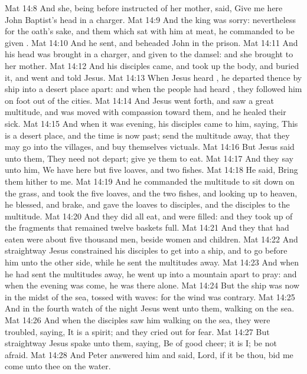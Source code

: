 \vs Mat 14:8 And she, being before instructed of her mother, said, Give me here John Baptist's head in a charger.
\vs Mat 14:9 And the king was sorry: nevertheless for the oath's sake, and them which sat with him at meat, he commanded  to be given .
\vs Mat 14:10 And he sent, and beheaded John in the prison.
\vs Mat 14:11 And his head was brought in a charger, and given to the damsel: and she brought  to her mother.
\vs Mat 14:12 And his disciples came, and took up the body, and buried it, and went and told Jesus.
\vs Mat 14:13 When Jesus heard , he departed thence by ship into a desert place apart: and when the people had heard , they followed him on foot out of the cities.
\vs Mat 14:14 And Jesus went forth, and saw a great multitude, and was moved with compassion toward them, and he healed their sick.
\vs Mat 14:15 And when it was evening, his disciples came to him, saying, This is a desert place, and the time is now past; send the multitude away, that they may go into the villages, and buy themselves victuals.
\vs Mat 14:16 But Jesus said unto them, They need not depart; give ye them to eat.
\vs Mat 14:17 And they say unto him, We have here but five loaves, and two fishes.
\vs Mat 14:18 He said, Bring them hither to me.
\vs Mat 14:19 And he commanded the multitude to sit down on the grass, and took the five loaves, and the two fishes, and looking up to heaven, he blessed, and brake, and gave the loaves to  disciples, and the disciples to the multitude.
\vs Mat 14:20 And they did all eat, and were filled: and they took up of the fragments that remained twelve baskets full.
\vs Mat 14:21 And they that had eaten were about five thousand men, beside women and children.
\vs Mat 14:22 And straightway Jesus constrained his disciples to get into a ship, and to go before him unto the other side, while he sent the multitudes away.
\vs Mat 14:23 And when he had sent the multitudes away, he went up into a mountain apart to pray: and when the evening was come, he was there alone.
\vs Mat 14:24 But the ship was now in the midst of the sea, tossed with waves: for the wind was contrary.
\vs Mat 14:25 And in the fourth watch of the night Jesus went unto them, walking on the sea.
\vs Mat 14:26 And when the disciples saw him walking on the sea, they were troubled, saying, It is a spirit; and they cried out for fear.
\vs Mat 14:27 But straightway Jesus spake unto them, saying, Be of good cheer; it is I; be not afraid.
\vs Mat 14:28 And Peter answered him and said, Lord, if it be thou, bid me come unto thee on the water.
